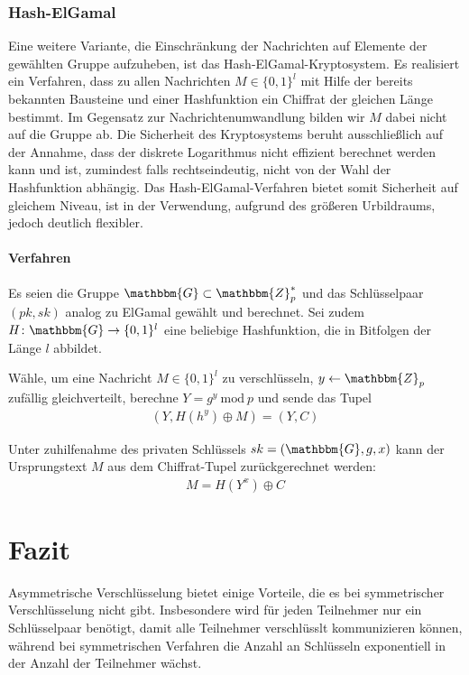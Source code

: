 \subsubsection{Hash-ElGamal} Eine weitere Variante, die Einschränkung
der Nachrichten auf Elemente der gewählten Gruppe aufzuheben, ist das
Hash-ElGamal-Kryptosystem. Es realisiert ein Verfahren, dass zu allen
Nachrichten $M \in \{0, 1\}^l$ mit Hilfe der bereits bekannten Bausteine
und einer Hashfunktion ein Chiffrat der gleichen Länge bestimmt. Im
Gegensatz zur Nachrichtenumwandlung bilden wir $M$ dabei nicht auf die
Gruppe ab. Die Sicherheit des Kryptosystems beruht ausschließlich auf
der Annahme, dass der diskrete Logarithmus nicht effizient berechnet
werden kann und ist, zumindest falls rechtseindeutig, nicht von der Wahl
der Hashfunktion abhängig. Das Hash-ElGamal-Verfahren bietet somit
Sicherheit auf gleichem Niveau, ist in der Verwendung, aufgrund des
größeren Urbildraums, jedoch deutlich flexibler.

\paragraph*{Verfahren} Es seien die Gruppe $\mathbbm{G} \subset
\mathbbm{Z}^*_p$ und das Schlüsselpaar $(pk,sk)$ analog zu ElGamal
gewählt und berechnet. Sei zudem $H \colon \mathbbm{G} \rightarrow
\{0,1\}^l$ eine beliebige Hashfunktion, die in Bitfolgen der Länge $l$
abbildet.

Wähle, um eine Nachricht $M \in \{0,1\}^l$ zu verschlüsseln, $y
\leftarrow \mathbbm{Z}_p$ zufällig gleichverteilt, berechne $Y = g^y\
\text{mod}\ p$ und sende das Tupel
\begin{align*} (Y, H(h^y) \oplus M) = (Y, C)
\end{align*}

Unter zuhilfenahme des privaten Schlüssels $sk = (\mathbbm{G}, g, x)$
kann der Ursprungstext $M$ aus dem Chiffrat-Tupel zurückgerechnet
werden:
\begin{align*} M = H(Y^x) \oplus C
\end{align*}

\section{Fazit}
Asymmetrische Verschlüsselung bietet einige Vorteile, die es bei
symmetrischer Verschlüsselung nicht gibt. Insbesondere wird für jeden
Teilnehmer nur ein Schlüsselpaar benötigt, damit alle Teilnehmer
verschlüsslt kommunizieren können, während bei symmetrischen Verfahren
die Anzahl an Schlüsseln exponentiell in der Anzahl der Teilnehmer
wächst.


